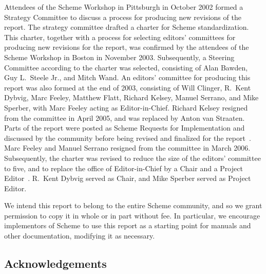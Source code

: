 
Attendees of the Scheme Workshop in Pittsburgh in October 2002 formed
a Strategy Committee to discuss a process for producing new revisions
of the report.  The strategy committee drafted a charter for Scheme
standardization.  This charter, together with a process for selecting
editors' committees for producing new revisions for the report, was
confirmed by the attendees of the Scheme Workshop in Boston in
November 2003.  Subsequently, a Steering Committee according to the
charter was selected, consisting of Alan Bawden, Guy L.\ Steele Jr.,
and Mitch Wand.  An editors' committee for producing this report was
also formed at the end of 2003, consisting of Will Clinger,
R.\ Kent Dybvig, Marc Feeley, Matthew Flatt, Richard Kelsey, Manuel
Serrano, and Mike Sperber, with Marc Feeley acting as Editor-in-Chief.
Richard Kelsey resigned from the committee in April 2005, and was
replaced by Anton van Straaten.  
Parts of the report were posted as Scheme Requests for Implementation
and discussed by the community before being revised and finalized for
the report~\cite{srfi75,srfi76,srfi77,srfi83,srfi93}.
Marc Feeley and Manuel Serrano
resigned from the committee in March 2006.  Subsequently, the charter
was revised to reduce the size of the editors' committee to five, and
to replace the office of Editor-in-Chief by a Chair and a Project
Editor~\cite{SchemeCharter2006}.  R.\ Kent Dybvig served as Chair, and
Mike Sperber served as Project Editor.

\medskip

We intend this report to belong to the entire Scheme community, and so
we grant permission to copy it in whole or in part without fee.  In
particular, we encourage implementors of Scheme to use this report as
a starting point for manuals and other documentation, modifying it as
necessary.




\subsection*{Acknowledgements}

